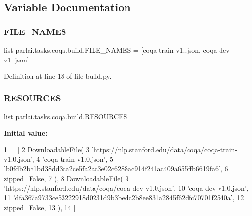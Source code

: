 \subsection{Variable Documentation}
\mbox{\label{namespaceparlai_1_1tasks_1_1coqa_1_1build_a1b34234fb0de0c56b0fec8db98b9e230}} 
\subsubsection{\texorpdfstring{F\+I\+L\+E\+\_\+\+N\+A\+M\+ES}{FILE\_NAMES}}
{\footnotesize\ttfamily list parlai.\+tasks.\+coqa.\+build.\+F\+I\+L\+E\+\_\+\+N\+A\+M\+ES = \mbox{[}\textquotesingle{}coqa-\/train-\/v1..\+json\textquotesingle{}, \textquotesingle{}coqa-\/dev-\/v1..\+json\textquotesingle{}\mbox{]}}



Definition at line 18 of file build.\+py.

\mbox{\label{namespaceparlai_1_1tasks_1_1coqa_1_1build_a7bb45b9538e95720878022ca1db0c715}} 
\subsubsection{\texorpdfstring{R\+E\+S\+O\+U\+R\+C\+ES}{RESOURCES}}
{\footnotesize\ttfamily list parlai.\+tasks.\+coqa.\+build.\+R\+E\+S\+O\+U\+R\+C\+ES}

{\bfseries Initial value\+:}
\begin{DoxyCode}
1 =  [
2     DownloadableFile(
3         \textcolor{stringliteral}{'https://nlp.stanford.edu/data/coqa/coqa-train-v1.0.json'},
4         \textcolor{stringliteral}{'coqa-train-v1.0.json'},
5         \textcolor{stringliteral}{'b0fdb2bc1bd38dd3ca2ce5fa2ac3e02c6288ac914f241ac409a655ffb6619fa6'},
6         zipped=\textcolor{keyword}{False},
7     ),
8     DownloadableFile(
9         \textcolor{stringliteral}{'https://nlp.stanford.edu/data/coqa/coqa-dev-v1.0.json'},
10         \textcolor{stringliteral}{'coqa-dev-v1.0.json'},
11         \textcolor{stringliteral}{'dfa367a9733ce53222918d0231d9b3bedc2b8ee831a2845f62dfc70701f2540a'},
12         zipped=\textcolor{keyword}{False},
13     ),
14 ]
\end{DoxyCode}


